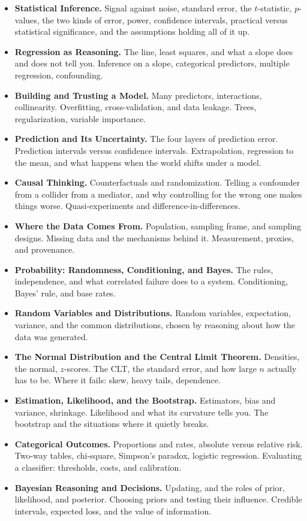 \documentclass[11pt]{article}
\begin{document}
\begin{itemize}[topsep=2pt,itemsep=2pt]
\item \textbf{Statistical Inference.} Signal against noise, standard error, the
  $t$-statistic, $p$-values, the two kinds of error, power, confidence intervals, practical versus
  statistical significance, and the assumptions holding all of it up.
\item \textbf{Regression as Reasoning.} The line, least squares, and what a slope does and does
  not tell you. Inference on a slope, categorical predictors, multiple regression, confounding.
\item \textbf{Building and Trusting a Model.} Many predictors, interactions, collinearity.
  Overfitting, cross-validation, and data leakage. Trees, regularization, variable importance.
\item \textbf{Prediction and Its Uncertainty.} The four layers of prediction error. Prediction
  intervals versus confidence intervals. Extrapolation, regression to the mean, and what happens
  when the world shifts under a model.
\item \textbf{Causal Thinking.} Counterfactuals and randomization. Telling a confounder from a
  collider from a mediator, and why controlling for the wrong one makes things worse.
  Quasi-experiments and difference-in-differences.
\item \textbf{Where the Data Comes From.} Population, sampling frame, and sampling designs.
  Missing data and the mechanisms behind it. Measurement, proxies, and provenance.
\item \textbf{Probability: Randomness, Conditioning, and Bayes.} The rules, independence, and
  what correlated failure does to a system. Conditioning, Bayes' rule, and base rates.
\item \textbf{Random Variables and Distributions.} Random variables, expectation, variance, and
  the common distributions, chosen by reasoning about how the data was generated.
\item \textbf{The Normal Distribution and the Central Limit Theorem.} Densities, the normal,
  $z$-scores. The CLT, the standard error, and how large $n$ actually has to be. Where it fails:
  skew, heavy tails, dependence.
\item \textbf{Estimation, Likelihood, and the Bootstrap.} Estimators, bias and variance,
  shrinkage. Likelihood and what its curvature tells you. The bootstrap and the situations where
  it quietly breaks.
\item \textbf{Categorical Outcomes.} Proportions and rates, absolute versus relative risk.
  Two-way tables, chi-square, Simpson's paradox, logistic regression. Evaluating a classifier:
  thresholds, costs, and calibration.
\item \textbf{Bayesian Reasoning and Decisions.} Updating, and the roles of prior, likelihood,
  and posterior. Choosing priors and testing their influence. Credible intervals, expected loss,
  and the value of information.
\end{itemize}
\end{document}
